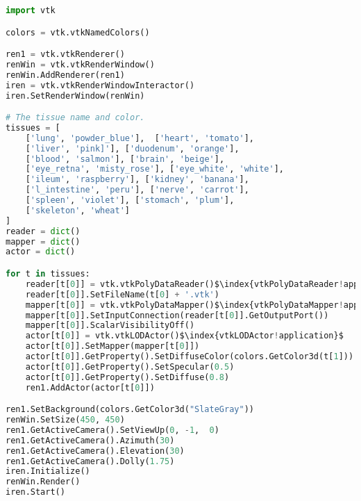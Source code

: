 \begin{lstlisting}[language=Python, caption={ViewFrog.py.}, escapechar=\$]
import vtk

colors = vtk.vtkNamedColors()

ren1 = vtk.vtkRenderer()
renWin = vtk.vtkRenderWindow()
renWin.AddRenderer(ren1)
iren = vtk.vtkRenderWindowInteractor()
iren.SetRenderWindow(renWin)

# The tissue name and color.
tissues = [
    ['lung', 'powder_blue'],  ['heart', 'tomato'],
    ['liver', 'pink]'], ['duodenum', 'orange'],
    ['blood', 'salmon'], ['brain', 'beige'],
    ['eye_retna', 'misty_rose'], ['eye_white', 'white'],
    ['ileum', 'raspberry'], ['kidney', 'banana'],
    ['l_intestine', 'peru'], ['nerve', 'carrot'],
    ['spleen', 'violet'], ['stomach', 'plum'],
    ['skeleton', 'wheat']
]
reader = dict()
mapper = dict()
actor = dict()

for t in tissues:
    reader[t[0]] = vtk.vtkPolyDataReader()$\index{vtkPolyDataReader!application}$
    reader[t[0]].SetFileName(t[0] + '.vtk')
    mapper[t[0]] = vtk.vtkPolyDataMapper()$\index{vtkPolyDataMapper!application}$
    mapper[t[0]].SetInputConnection(reader[t[0]].GetOutputPort())
    mapper[t[0]].ScalarVisibilityOff()
    actor[t[0]] = vtk.vtkLODActor()$\index{vtkLODActor!application}$
    actor[t[0]].SetMapper(mapper[t[0]])
    actor[t[0]].GetProperty().SetDiffuseColor(colors.GetColor3d(t[1]))
    actor[t[0]].GetProperty().SetSpecular(0.5)
    actor[t[0]].GetProperty().SetDiffuse(0.8)
    ren1.AddActor(actor[t[0]])

ren1.SetBackground(colors.GetColor3d("SlateGray"))
renWin.SetSize(450, 450)
ren1.GetActiveCamera().SetViewUp(0, -1,  0)
ren1.GetActiveCamera().Azimuth(30)
ren1.GetActiveCamera().Elevation(30)
ren1.GetActiveCamera().Dolly(1.75)
iren.Initialize()
renWin.Render()
iren.Start()

\end{lstlisting}


